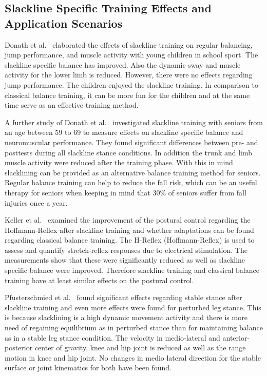 \subsection{Slackline Specific Training Effects and Application Scenarios}

Donath et al.~\cite{Donath2013-kk} elaborated the effects of slackline training on regular balancing, jump performance, and muscle activity with young children in school sport. The slackline specific balance has improved. Also the dynamic sway and muscle activity for the lower limb is reduced. However, there were no effects regarding jump performance. The children enjoyed the slackline training. In comparison to classical balance training, it can be more fun for the children and at the same time serve as an effective training method.

A further study of Donath et al.~\cite{Donath2016-gm} investigated slackline training with seniors from an age between 59 to 69 to measure effects on slackline specific balance and neuromuscular performance. They found significant differences between pre- and posttests during all slackline stance conditions. In addition the trunk and limb muscle activity were reduced after the training phase. With this in mind slacklining can be provided as an alternative balance training method for seniors. Regular balance training can help to reduce the fall risk, which can be an useful therapy for seniors when keeping in mind that 30\% of seniors suffer from fall injuries once a year.

Keller et al.~\cite{Keller2012-xh} examined the improvement of the postural control regarding the Hoffmann-Reflex after slackline training and whether adaptations can be found regarding classical balance training. The H-Reflex (Hoffmann-Reflex) is used to assess and quantify stretch-reflex responses due to electrical stimulation. The measurements show that these were significantly reduced as well as slackline specific balance were improved. Therefore slackline training and classical balance training have at least similar effects on the postural control.

Pfusterschmied et al.~\cite{Pfusterschmied2013-yy} found significant effects regarding stable stance after slackline training and even more effects were found for perturbed leg stance. This is because slacklining is a high dynamic movement activity and there is more need of regaining equilibrium as in perturbed stance than for maintaining balance as in a stable leg stance condition. The velocity in medio-lateral and anterior-posterior center of gravity, knee and hip joint is reduced as well as the range motion in knee and hip joint. No changes in medio lateral direction for the stable surface or joint kinematics for both have been found.

